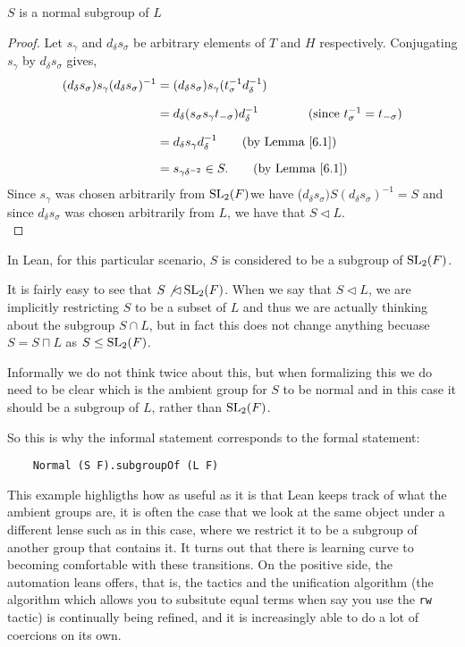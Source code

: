 \begin{lemma}
\label{SpecialSubgroups.normal_S_subgroupOf_L}
\leanok
$S$ is a normal subgroup of $L$
\end{lemma}

\begin{proof}
    Let $s_\gamma$ and $d_\delta s_\sigma$ be arbitrary elements of $T$ and $H$ respectively. Conjugating $s_\gamma$ by $d_\delta s_\sigma$ gives,
\begin{align*} (d_\delta s_\sigma) s_\gamma (d_\delta s_\sigma)^{-1} &= (d_\delta s_\sigma) s_\gamma (t^{-1}_\sigma d^{-1}_\delta) \\[1.5ex]
&=
d_\delta (s_\sigma s_\gamma t_{-\sigma}) d^{-1}_\delta \qquad \tag{since $t^{-1}_\sigma=t_{-\sigma}$} \\[1.5ex] 
&=
d_\delta s_\gamma d^{-1}_\delta \tag{by Lemma \ref{6.1}} \\[1.5ex] 
&= s_{\gamma \delta^{-2}} \in S. \tag{by Lemma \ref{6.1}}
\end{align*}
Since $s_\gamma$ was chosen arbitrarily from $\operatorname{SL}_2(F)$we have ($d_\delta s_\sigma) S (d_\delta s_\sigma)^{-1} = S$ and since $d_\delta s_\sigma$ was chosen arbitrarily from $L$, we have that $S \vartriangleleft L$. \\
\end{proof}

\begin{remark}
    In Lean, for this particular scenario, $S$ is considered to be a subgroup of $\operatorname{SL}_2(F)$. 
    
    It is fairly easy to see that $S \not\lhd \operatorname{SL}_2(F)$. When we say that $S \lhd L$, we are implicitly restricting $S$ to be a subset of $L$ and thus we are actually thinking about the subgroup $S \cap L$,
    but in fact this does not change anything becuase $S = S \sqcap L$ as $S \le \operatorname{SL}_2(F)$.

    Informally we do not think twice about this, but when formalizing this we do need to be clear which is the ambient group for $S$ to be normal and in this case it should be a subgroup of $L$, rather than $\operatorname{SL}_2(F)$.
    
    So this is why the informal statement corresponds to the formal statement:

    \begin{verbatim}
    Normal (S F).subgroupOf (L F) 
    \end{verbatim}

    This example highligths how as useful as it is that Lean keeps track of what the ambient groups are, it is often the case that we look at the same object under a different lense such as in this case, where we restrict it to be a 
    subgroup of another group that contains it. It turns out that there is learning curve to becoming comfortable with these transitions.
    On the positive side, the automation leans offers, that is, the tactics and the unification algorithm (the algorithm which allows you to subsitute equal terms when say you use the  \texttt{rw} tactic) is continually being refined, 
    and it is increasingly able to do a lot of coercions on its own.
\end{remark}


